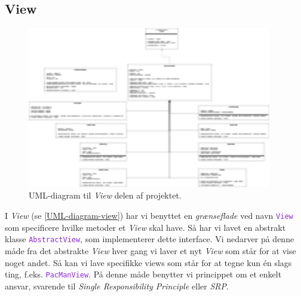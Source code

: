 \documentclass{article}
\newcommand{\class}[1]{\textcolor{BlueViolet}{\small\texttt{#1}}}
\theoremstyle{mytheoremstyle}
\theoremstyle{mytheoremstyle}
\theoremstyle{myproblemstyle}
\begin{document}
\subsection{View}\label{sub:View} %
\begin{figure}[H]
    \begin{center}
        \includegraphics[width=0.95\textwidth]{figures/UML-diagram-view.png}
    \end{center}
    \caption{UML-diagram til \textit{View} delen af projektet.}
    \label{UML-diagram-view}
\end{figure}
I \textit{View} (se \autoref{UML-diagram-view}) har vi benyttet en
\textit{grænseflade} ved navn \class{View} som specificere hvilke metoder et
\textit{View} skal have. Så har vi lavet en abstrakt klasse \class{AbstractView},
som implementerer dette interface. Vi nedarver på denne måde fra det abstrakte
\textit{View} hver gang vi laver et nyt \textit{View} som står for at vise noget
andet. Så kan vi lave specifikke views som står for at tegne kun én slags ting,
f.eks. \class{PacManView}. På denne måde benytter vi princippet om et enkelt
ansvar, svarende til \textit{Single Responsibility Principle} eller \textit{SRP}.
\end{document}
